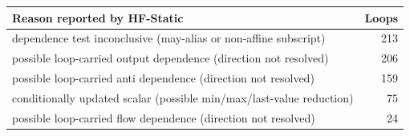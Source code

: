 \begin{tabular}{lr}
\toprule
Reason reported by HF-Static & Loops \\
\midrule
dependence test inconclusive (may-alias or non-affine subscript) & 213 \\
possible loop-carried output dependence (direction not resolved) & 206 \\
possible loop-carried anti dependence (direction not resolved) & 159 \\
conditionally updated scalar (possible min/max/last-value reduction) & 75 \\
possible loop-carried flow dependence (direction not resolved) & 24 \\
\bottomrule
\end{tabular}
